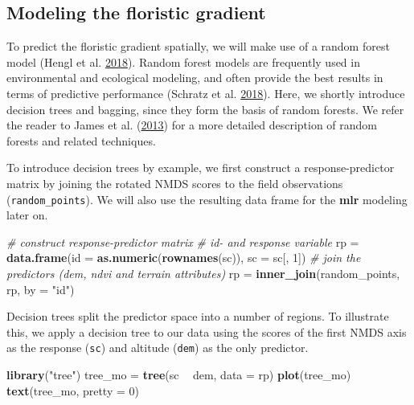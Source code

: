 \documentclass[]{krantz}
\newenvironment{Shaded}{\begin{snugshade}}{\end{snugshade}}
\newcommand{\CommentTok}[1]{\textcolor[rgb]{0.37,0.37,0.37}{\textit{#1}}}
\newcommand{\DataTypeTok}[1]{\textcolor[rgb]{0.27,0.27,0.27}{#1}}
\newcommand{\DecValTok}[1]{\textcolor[rgb]{0.06,0.06,0.06}{#1}}
\newcommand{\KeywordTok}[1]{\textcolor[rgb]{0.27,0.27,0.27}{\textbf{#1}}}
\newcommand{\NormalTok}[1]{#1}
\newcommand{\OperatorTok}[1]{\textcolor[rgb]{0.43,0.43,0.43}{\textbf{#1}}}
\newcommand{\StringTok}[1]{\textcolor[rgb]{0.5,0.5,0.5}{#1}}
\begin{document}
\hypertarget{modeling-the-floristic-gradient}{%
\subsection{Modeling the floristic gradient}\label{modeling-the-floristic-gradient}}

To predict the floristic gradient spatially, we will make use of a random forest model (Hengl et al. \protect\hyperlink{ref-hengl_random_2018}{2018}).
Random forest models are frequently used in environmental and ecological modeling, and often provide the best results in terms of predictive performance (Schratz et al. \protect\hyperlink{ref-schratz_performance_nodate}{2018}).
Here, we shortly introduce decision trees and bagging, since they form the basis of random forests.
We refer the reader to James et al. (\protect\hyperlink{ref-james_introduction_2013}{2013}) for a more detailed description of random forests and related techniques.

To introduce decision trees by example, we first construct a response-predictor matrix by joining the rotated NMDS scores to the field observations (\texttt{random\_points}).
We will also use the resulting data frame for the \textbf{mlr} modeling later on.

\begin{Shaded}
\begin{Highlighting}[]
\CommentTok{# construct response-predictor matrix}
\CommentTok{# id- and response variable}
\NormalTok{rp =}\StringTok{ }\KeywordTok{data.frame}\NormalTok{(}\DataTypeTok{id =} \KeywordTok{as.numeric}\NormalTok{(}\KeywordTok{rownames}\NormalTok{(sc)), }\DataTypeTok{sc =}\NormalTok{ sc[, }\DecValTok{1}\NormalTok{])}
\CommentTok{# join the predictors (dem, ndvi and terrain attributes)}
\NormalTok{rp =}\StringTok{ }\KeywordTok{inner_join}\NormalTok{(random_points, rp, }\DataTypeTok{by =} \StringTok{"id"}\NormalTok{)}
\end{Highlighting}
\end{Shaded}

Decision trees split the predictor space into a number of regions.
To illustrate this, we apply a decision tree to our data using the scores of the first NMDS axis as the response (\texttt{sc}) and altitude (\texttt{dem}) as the only predictor.

\begin{Shaded}
\begin{Highlighting}[]
\KeywordTok{library}\NormalTok{(}\StringTok{"tree"}\NormalTok{)}
\NormalTok{tree_mo =}\StringTok{ }\KeywordTok{tree}\NormalTok{(sc }\OperatorTok{~}\StringTok{ }\NormalTok{dem, }\DataTypeTok{data =}\NormalTok{ rp)}
\KeywordTok{plot}\NormalTok{(tree_mo)}
\KeywordTok{text}\NormalTok{(tree_mo, }\DataTypeTok{pretty =} \DecValTok{0}\NormalTok{)}
\end{Highlighting}
\end{Shaded}
\end{document}
